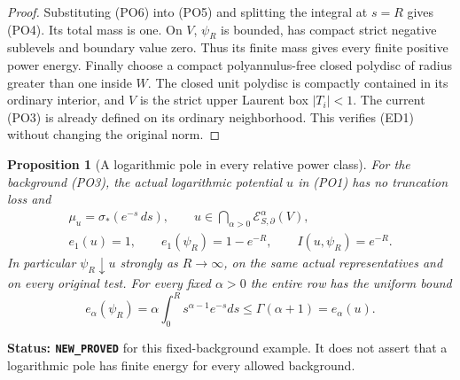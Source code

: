 \documentclass[11pt,a4paper]{article}
\numberwithin{equation}{section}
\newtheorem{proposition}[theorem]{Proposition}
\theoremstyle{definition}
\theoremstyle{remark}
\begin{document}
\begin{proof}
Substituting \textup{(PO6)} into \textup{(PO5)} and
splitting the integral at $s=R$ gives \textup{(PO4)}.
Its total mass is one.  On $V$, $\psi_R$ is bounded,
has compact strict negative sublevels and boundary value
zero.  Thus its finite mass gives every finite positive
power energy.  Finally choose a compact polyannulus-free
closed polydisc of radius greater than one inside $W$.
The closed unit polydisc is compactly contained in its
ordinary interior, and $V$ is the strict upper Laurent
box $|T_i|<1$.  The current \textup{(PO3)} is already
defined on its ordinary neighborhood.  This verifies
\textup{(ED1)} without changing the original norm.
\end{proof}

\begin{proposition}[A logarithmic pole in every relative power class]
\label{prop:r12-logarithmic-all-power-relative-pole}
For the background \textup{(PO3)}, the actual logarithmic
potential $u$ in \textup{(PO1)} has no truncation loss and
\[
 \begin{gathered}
 \mu_u=\sigma_*(e^{-s}\,ds),\qquad
 u\in\bigcap_{\alpha>0}\mathcal E^\alpha_{S,\partial}(V),\\
 e_1(u)=1,\qquad e_1(\psi_R)=1-e^{-R},\qquad
                     I(u,\psi_R)=e^{-R}.
 \end{gathered}
 \tag{PO7}
\]
In particular $\psi_R\downarrow u$ strongly as $R\to\infty$,
on the same actual representatives and on every original test.
For every fixed $\alpha>0$ the entire row has the uniform bound
\[
 e_\alpha(\psi_R)
       =\alpha\int_0^R s^{\alpha-1}e^{-s}ds
       \le\Gamma(\alpha+1)=e_\alpha(u).
 \tag{PO7a}
\]
\end{proposition}

\noindent\textbf{Status: \texttt{NEW\_PROVED}} for this
fixed-background example.  It does not assert that a logarithmic
pole has finite energy for every allowed background.
\end{document}

